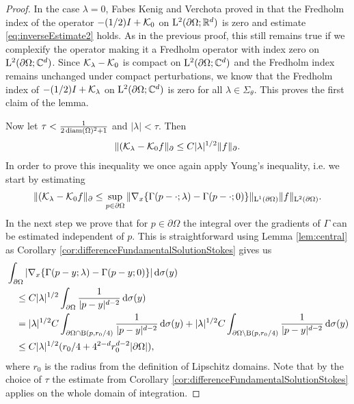 \begin{proof}
  In the case $\lambda = 0$, Fabes Kenig and Verchota proved in \cite{fabesKenigVerchota} that the Fredholm index of the operator $-(1/2)I + \mathcal{K}_0$ on $\mathrm{L}^2(\partial\Omega; \mathbb{R}^d)$ is zero and estimate \eqref{eq:inverseEstimate2} holds.
  As in the previous proof, this still remains true if we complexify the operator making it a Fredholm operator with index zero on  $\mathrm{L}^2(\partial\Omega; \mathbb{C}^d)$.
  Since $\mathcal{K}_\lambda - \mathcal{K}_0$ is compact on $\mathrm{L}^2(\partial\Omega; \mathbb{C}^d)$ and the Fredholm index remains unchanged under compact perturbations, we know that the Fredholm index of $-(1/2)I + \mathcal{K}_\lambda$ on $\mathrm{L}^2(\partial\Omega; \mathbb{C}^d)$ is zero for all $\lambda \in \Sigma_\theta$.
  This proves the first claim of the lemma.

  Now let $\tau < \frac{1}{2 \operatorname{diam}(\Omega)^2 + 1}$ and $|\lambda| < \tau$.
  Then
  \begin{align*}
    \| (\mathcal{K}_\lambda - \mathcal{K}_0 f\|_\partial \leq C |\lambda|^{1/2} \|f\|_\partial.
  \end{align*}
  In order to prove this inequality we once again apply Young's inequality, i.e. we start by estimating
  \begin{align*}
    \| (\mathcal{K}_\lambda - \mathcal{K}_0 f\|_\partial \leq \sup_{p \in \partial\Omega} \| \nabla_x \{ \Gamma(p - \cdot; \lambda) - \Gamma(p - \cdot; 0) \} \|_{\mathrm{L}^1(\partial\Omega)} \| f\|_{\mathrm{L}^2(\partial\Omega)}.
  \end{align*}
  In the next step we prove that for $p \in \partial\Omega$ the integral over the gradients of $\Gamma$ can be estimated independent of $p$.
  This is straightforward using Lemma \ref{lem:central} as Corollary \ref{cor:differenceFundamentalSolutionStokes} gives us
  \begin{align*}
    &\int_{\partial\Omega} | \nabla_x \{ \Gamma(p - y; \lambda) - \Gamma(p - y; 0) \} | \, {\operatorname{d}\!{\sigma}}(y)\\
    &\quad\leq C |\lambda|^{1/2} \int_{\partial\Omega} \frac{1}{|p - y|^{d - 2}} \, {\operatorname{d}\!{\sigma}}(y) \\
    &\quad= |\lambda|^{1/2} C \int_{\partial\Omega \cap \mathrm{B}(p, r_0/4)} \frac{1}{|p - y|^{d - 2}} \, {\operatorname{d}\!{\sigma}}(y) + |\lambda|^{1/2} C \int_{\partial\Omega \setminus \mathrm{B}(p, r_0/4)} \frac{1}{|p - y|^{d - 2}} \, {\operatorname{d}\!{\sigma}}(y) \\
    &\quad\leq C |\lambda|^{1/2} ( r_0/4 + 4^{2 - d} r_0^{d - 2} |\partial\Omega| ),
  \end{align*}
  where $r_0$ is the radius from the definition of Lipschitz domains. 
  Note that by the choice of $\tau$ the estimate from Corollary \ref{cor:differenceFundamentalSolutionStokes} applies on the whole domain of integration.


\end{proof}
